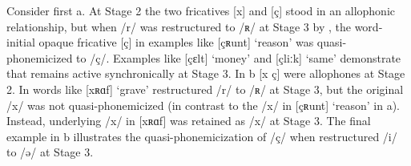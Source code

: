 \begin{table}
\small
{}
  \caption{\label{extab:7:12} Historical derivations  for word-initial [x ç] from Reinhausen  and Schieder-Schwalenberg}
\end{table}

Consider first a. At Stage 2 the two fricatives [x] and [ç] stood in an allophonic relationship, but when /r/ was restructured to /ʀ/ at Stage 3 by , the word-initial opaque fricative [ç] in examples like [çʀunt] ‘reason’ was quasi-phonemicized to /ç/. Examples like [çɛlt] ‘money’ and [çliːk] ‘same’ demonstrate that  remains active synchronically at Stage 3. In b [x ç] were allophones at Stage 2. In words like [xʀɑf] ‘grave’  restructured /r/ to /ʀ/ at Stage 3, but the original /x/ was not quasi-phonemicized (in contrast to the /x/ in  [çʀunt] ‘reason’ in a). Instead, underlying /x/ in [xʀɑf] was retained as /x/ at Stage 3. The final example in b illustrates the quasi-phonemicization of /ç/ when  restructured /i/ to /ə/ at Stage 3.

